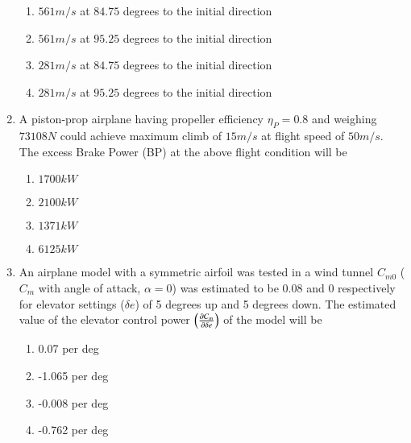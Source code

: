 \documentclass[journal]{IEEEtran}
\begin{document}
\begin{enumerate}
    \begin{enumerate}
        \item $561 m/s$ at $84.75$ degrees to the initial direction
        \item $561 m/s$ at $95.25$ degrees to the initial direction
        \item $281 m/s$ at $84.75$ degrees to the initial direction
        \item $281 m/s$ at $95.25$ degrees to the initial direction
    \end{enumerate}

    \item A piston-prop airplane having propeller efficiency $\eta_P = 0.8$ and weighing $73108 N$
    could achieve maximum climb of $15 m/s$ at flight speed of $50 m/s$. The excess Brake Power (BP)
    at the above flight condition will be

    \begin{multicols}{4}
        \begin{enumerate}
            \item $1700 kW$
            \item $2100 kW$
            \item $1371 kW$
            \item $6125 kW$
        \end{enumerate}
    \end{multicols}

    \item An airplane model with a symmetric airfoil was tested in a wind tunnel $C_{m0}$ ($C_m$ with
    angle of attack, $\alpha = 0$) was estimated to be $0.08$ and $0$ respectively for elevator settings
    ($\delta e$) of 5 degrees up and 5 degrees down. The estimated value of the elevator control power
    $\left(\frac{\partial C_m}{\partial \delta e}\right)$ of the model will be

    \begin{multicols}{2}
        \begin{enumerate}
            \item 0.07 per deg
            \item -1.065 per deg
            \item -0.008 per deg
            \item -0.762 per deg
        \end{enumerate}
    \end{multicols}

\end{enumerate}
\end{document}
